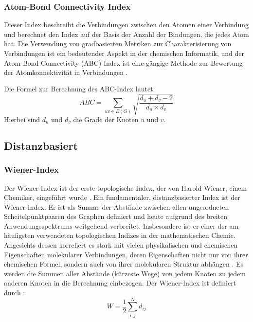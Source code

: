 \subsubsection{Atom-Bond Connectivity Index}

Dieser Index beschreibt die Verbindungen zwischen den Atomen einer Verbindung und berechnet den Index auf der Basis der Anzahl der Bindungen, die jedes Atom hat.
Die Verwendung von gradbasierten Metriken zur Charakterisierung von Verbindungen ist ein bedeutender Aspekt in der chemischen Informatik, und der Atom-Bond-Connectivity (ABC) Index ist eine gängige Methode zur Bewertung der Atomkonnektivität in Verbindungen \cite{estrada_atom-bond_1998}.

Die Formel zur Berechnung des ABC-Index lautet:
\begin{equation}
    ABC = \sum_{uv \in E(G)} \sqrt{\frac{d_u + d_v - 2} {d_u \times d_v}}
\end{equation}
Hierbei sind $d_u$ und $d_v$ die Grade der Knoten $u$ und $v$.

\subsection{Distanzbasiert}

\subsubsection{Wiener-Index}

Der Wiener-Index ist der erste topologische Index, der von Harold Wiener, einem Chemiker, eingeführt wurde \cite{fath-tabar_hyper-wiener_2011}.
Ein fundamentaler, distanzbasierter Index ist der Wiener-Index. Er ist als Summe der Abstände zwischen allen ungeordneten Scheitelpunktpaaren des Graphen definiert und heute aufgrund des breiten Anwendungsspektrums weitgehend verbreitet.
Insbesondere ist er einer der am häufigsten verwendeten topologischen Indizes in der mathematischen Chemie.
Angesichts dessen korreliert es stark mit vielen physikalischen und chemischen Eigenschaften molekularer Verbindungen, deren Eigenschaften nicht nur von ihrer chemischen Formel, sondern auch von ihrer molekularen Struktur abhängen \cite[p.~2]{cavaleri_group_2021}.
Es werden die Summen aller Abstände (kürzeste Wege) von jedem Knoten zu jedem anderen Knoten in die Berechnung einbezogen.
Der Wiener-Index ist definiert durch \cite[p.~17]{wiener_structural_1947}:
\begin{equation}
    W = \frac{1}{2}\sum^N_{i,j}d_{ij}
\end{equation}

